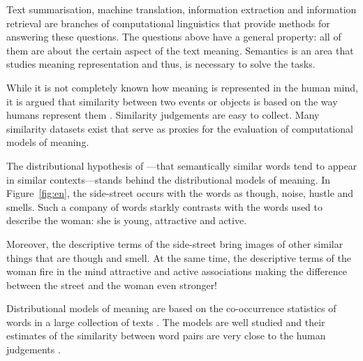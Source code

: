 Text summarisation, machine translation, information extraction and information retrieval are branches of computational linguistics that provide methods for answering these questions. The questions above have a general property: all of them are about the certain aspect of the text meaning. Semantics is an area that studies meaning representation and thus, is necessary to solve the tasks.

While it is not completely known how meaning is represented in the human mind, it is argued that similarity between two events or objects is based on the way humans represent them \cite{WCS:WCS1282}. Similarity judgements are easy to collect. Many similarity datasets exist that serve as proxies for the evaluation of computational models of meaning.

The distributional hypothesis of \citet{harris1954distributional}---that semantically similar words tend to appear in similar contexts---stands behind the distributional models of meaning. In Figure~\ref{fig:en}, the side-street occurs with the words as though, noise, hustle and smells. Such a company of words starkly contrasts with the words used to describe the woman: she is young, attractive and active.

Moreover, the descriptive terms of the side-street bring images of other similar things that are though and smell. At the same time, the descriptive terms of the woman fire in the mind attractive and active associations making the difference between the street and the woman even stronger!

Distributional models of meaning are based on the co-occurrence statistics of words in a large collection of texts \cite{Turney:2010:FMV:1861751.1861756,mikolov2013linguistic,mikolov2013distributed,mikolov2013efficient}. The models are well studied and their estimates of the similarity between word pairs are very close to the human judgements \cite{TACL570,baroni-dinu-kruszewski:2014:P14-1,Halawi:2012:LLW:2339530.2339751}.


